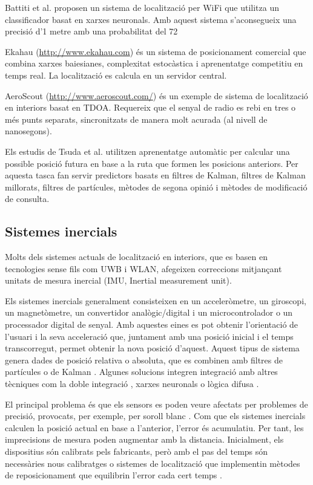 Battiti et al. \cite{battiti} proposen un sistema de localització per WiFi que utilitza un classificador basat en xarxes neuronals. Amb aquest sistema s'aconsegueix una precisió d'1 metre amb una probabilitat del 72%

Ekahau (\url{http://www.ekahau.com}) és un sistema de posicionament comercial que combina xarxes baiesianes, complexitat estocàstica i aprenentatge competitiu en temps real. La localització es calcula en un servidor central.

AeroScout (\url{http://www.aeroscout.com/}) és un exemple de sistema de localització en interiors basat en TDOA. Requereix que el senyal de radio es rebi en tres o més punts separats, sincronitzats de manera molt acurada (al nivell de nanosegons).

Els estudis de Tsuda et al. \cite{tsuda} utilitzen aprenentatge automàtic per calcular una possible posició futura en base a la ruta que formen les posicions anteriors. Per aquesta tasca fan servir predictors basats en filtres de Kalman, filtres de Kalman millorats, filtres de partícules, mètodes de segona opinió i mètodes de modificació de consulta.


\subsection{Sistemes inercials}

Molts dels sistemes actuals de localització en interiors, que es basen en tecnologies sense fils com UWB i WLAN, afegeixen correccions mitjançant unitats de mesura inercial (IMU, Inertial measurement unit).

Els sistemes inercials generalment consisteixen en un acceleròmetre, un giroscopi, un magnetòmetre, un convertidor analògic/digital i un microcontrolador o un processador digital de senyal. Amb aquestes eines es pot obtenir l'orientació de l’usuari i la seva acceleració que, juntament amb una posició inicial i el temps transcorregut, permet obtenir la nova posició d’aquest. Aquest tipus de sistema genera dades de posició relativa o absoluta, que es combinen amb filtres de partícules o de Kalman \cite{vilaseca}. Algunes solucions integren integració amb altres tècniques com la doble integració \cite{negard}, xarxes neuronals \cite{beauregard} o lògica difusa \cite{tome} \cite{garcia}.

El principal problema és que els sensors es poden veure afectats per problemes de precisió, provocats, per exemple, per soroll blanc \cite{vilaseca}. Com que els sistemes inercials calculen la posició actual en base a l'anterior, l’error és acumulatiu. Per tant, les imprecisions de mesura poden augmentar amb la distancia. Inicialment, els dispositius són calibrats pels fabricants, però amb el pas del temps són necessàries nous calibratges o sistemes de localització que implementin mètodes de reposicionament que equilibrin l'error cada cert temps \cite{glancer}.

